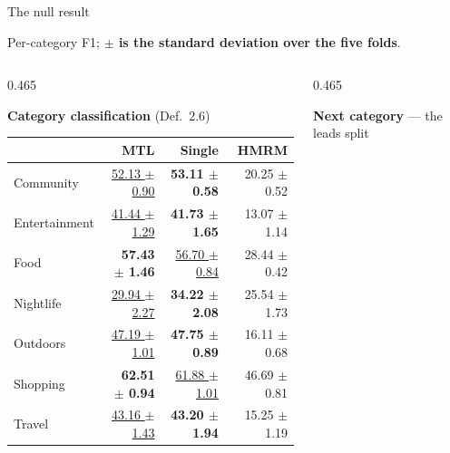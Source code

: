 \documentclass{beamer}
\begin{document}
\begin{frame}{The null result}

    {\centering\scriptsize Per-category F1; \textbf{$\pm$ is the standard deviation over the five folds}.\par}

    \begin{columns}[t,onlytextwidth]
        \begin{column}{0.465\textwidth}
            {\centering\scriptsize\textbf{Category classification} (Def.~2.6)\par}
            {\scriptsize
            \setlength{\tabcolsep}{1pt}
            \renewcommand{\arraystretch}{1.1}\begin{tabular}{@{}lrrr@{}}
                \toprule
                 & \textbf{MTL} & \textbf{Single} & \textbf{HMRM} \\
                \midrule
                Community     & \underline{52.13 $\pm$ 0.90} & \textbf{53.11 $\pm$ 0.58} & 20.25 $\pm$ 0.52 \\
                Entertainment & \underline{41.44 $\pm$ 1.29} & \textbf{41.73 $\pm$ 1.65} & 13.07 $\pm$ 1.14 \\
                Food          & \textbf{57.43 $\pm$ 1.46} & \underline{56.70 $\pm$ 0.84}          & 28.44 $\pm$ 0.42 \\
                Nightlife     & \underline{29.94 $\pm$ 2.27} & \textbf{34.22 $\pm$ 2.08} & 25.54 $\pm$ 1.73 \\
                Outdoors      & \underline{47.19 $\pm$ 1.01} & \textbf{47.75 $\pm$ 0.89} & 16.11 $\pm$ 0.68 \\
                Shopping      & \textbf{62.51 $\pm$ 0.94} & \underline{61.88 $\pm$ 1.01}          & 46.69 $\pm$ 0.81 \\
                Travel        & \underline{43.16 $\pm$ 1.43} & \textbf{43.20 $\pm$ 1.94} & 15.25 $\pm$ 1.19 \\
                \bottomrule
            \end{tabular}\par}
        \end{column}
        \hfill
        \begin{column}{0.465\textwidth}
            {\centering\scriptsize\textbf{Next category} --- the leads split\par}
            {\scriptsize
            \setlength{\tabcolsep}{1pt}
            \renewcommand{\arraystretch}{1.1}\begin{tabular}{@{}lrrr@{}}
                \toprule

\end{tabular}}
\end{column}
\end{columns}
\end{frame}
\end{document}

